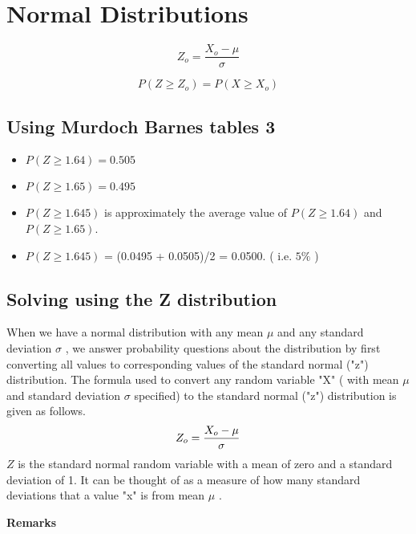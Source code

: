 \documentclass[]{report}
\begin{document}
\section{Normal Distributions}
\begin{equation}
Z_{o}= \frac{ X_{o}-\mu }{\sigma}
\end{equation}

\begin{equation}
P(Z \geq Z_{o}) = P(X \geq X_{o})
\end{equation}

{
\subsection{Using Murdoch Barnes tables 3}
\begin{itemize}
\item $ P(Z \geq 1.64) = 0.505$
\item $ P(Z \geq 1.65) = 0.495$ \bigskip
\item $ P(Z \geq 1.645)$ is approximately the average value of $ P(Z \geq 1.64)$ and $ P(Z \geq 1.65)$.
\item $ P(Z \geq 1.645)$ = (0.0495 + 0.0505)/2 = 0.0500. ( i.e. $5\%$ )
\end{itemize}
}







\subsection{Solving using the Z distribution}
When we have a normal distribution with any mean $\mu$ and any standard deviation $\sigma$ , we answer probability questions about the distribution by first converting all values to corresponding values of the standard normal ("z") distribution.
The formula used to convert any random variable "X" ( with mean $\mu$ and standard deviation $\sigma$ specified) to the standard normal ("z") distribution is given as follows.
\[ Z_o = {X_o - \mu \over \sigma} \]
$Z$ is the standard normal random variable with a mean of zero and a standard deviation of 1.
It can be thought of as a measure of how many standard deviations that a value "x" is from mean $\mu$ .


\noindent \textbf{Remarks}
\end{document}
